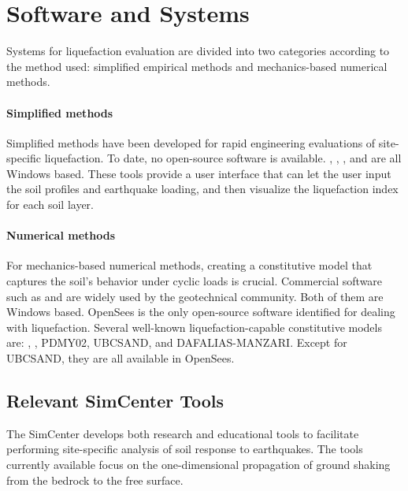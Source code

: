 \section{Software and Systems}
\label{sec:eq_liq_tools}

Systems for liquefaction evaluation are divided into two categories according to the method used: simplified empirical methods and mechanics-based numerical methods.

\paragraph{Simplified methods}
Simplified methods have been developed for rapid engineering evaluations of site-specific liquefaction. To date, no open-source software is available. , , , and  are all Windows based. These tools provide a user interface that can let the user input the soil profiles and earthquake loading, and then visualize the liquefaction index for each soil layer.

\paragraph{Numerical methods}
For mechanics-based numerical methods, creating a constitutive model that captures the soil's behavior under cyclic loads is crucial. Commercial software such as  and  are widely used by the geotechnical community. Both of them are Windows based. OpenSees is the only open-source software identified for dealing with liquefaction. Several well-known liquefaction-capable constitutive models are: , , PDMY02, UBCSAND, and DAFALIAS-MANZARI. Except for UBCSAND, they are all available in OpenSees.

\subsection{Relevant SimCenter Tools}

The SimCenter develops both research and educational tools to facilitate performing site-specific analysis of soil response to earthquakes. The tools currently available focus on the one-dimensional propagation of ground shaking from the bedrock to the free surface.

